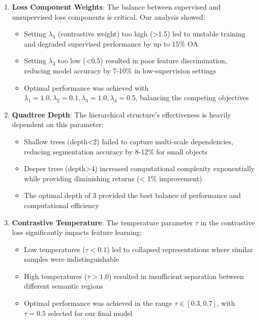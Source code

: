 \documentclass[conference]{IEEEtran}
\begin{document}
\begin{enumerate}
    \item \textbf{Loss Component Weights}: The balance between supervised and unsupervised loss components is critical. Our analysis showed:
    \begin{itemize}
        \item Setting $\lambda_3$ (contrastive weight) too high (>1.5) led to unstable training and degraded supervised performance by up to 15\% OA
        \item Setting $\lambda_3$ too low (<0.5) resulted in poor feature discrimination, reducing model accuracy by 7-10\% in low-supervision settings
        \item Optimal performance was achieved with $\lambda_1=1.0, \lambda_2=0.1, \lambda_3=1.0, \lambda_4=0.5$, balancing the competing objectives
    \end{itemize}
    
    \item \textbf{Quadtree Depth}: The hierarchical structure's effectiveness is heavily dependent on this parameter:
    \begin{itemize}
        \item Shallow trees (depth<2) failed to capture multi-scale dependencies, reducing segmentation accuracy by 8-12\% for small objects
        \item Deeper trees (depth>4) increased computational complexity exponentially while providing diminishing returns (< 1\% improvement)
        \item The optimal depth of 3 provided the best balance of performance and computational efficiency
    \end{itemize}
    
    \item \textbf{Contrastive Temperature}: The temperature parameter $\tau$ in the contrastive loss significantly impacts feature learning:
    \begin{itemize}
        \item Low temperatures ($\tau < 0.1$) led to collapsed representations where similar samples were indistinguishable
        \item High temperatures ($\tau > 1.0$) resulted in insufficient separation between different semantic regions
        \item Optimal performance was achieved in the range $\tau \in [0.3, 0.7]$, with $\tau = 0.5$ selected for our final model
    \end{itemize}
\end{enumerate}
\end{document}
